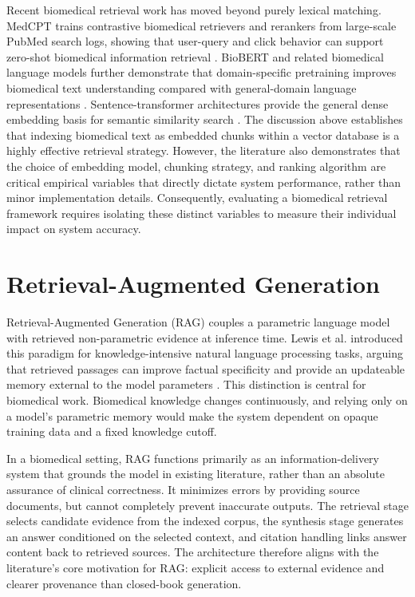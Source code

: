 Recent biomedical retrieval work has moved beyond purely lexical matching. MedCPT trains contrastive biomedical retrievers and rerankers from large-scale PubMed search logs, showing that user-query and click behavior can support zero-shot biomedical information retrieval \cite{jin2023medcpt}. BioBERT and related biomedical language models further demonstrate that domain-specific pretraining improves biomedical text understanding compared with general-domain language representations \cite{lee2020biobert}. Sentence-transformer architectures provide the general dense embedding basis for semantic similarity search \cite{reimers2019sentencebert}. The discussion above establishes that indexing biomedical text as embedded chunks within a vector database is a highly effective retrieval strategy. However, the literature also demonstrates that the choice of embedding model, chunking strategy, and ranking algorithm are critical empirical variables that directly dictate system performance, rather than minor implementation details. Consequently, evaluating a biomedical retrieval framework requires isolating these distinct variables to measure their individual impact on system accuracy.

\section{Retrieval-Augmented Generation}

Retrieval-Augmented Generation (RAG) couples a parametric language model with retrieved non-parametric evidence at inference time. Lewis et al. introduced this paradigm for knowledge-intensive natural language processing tasks, arguing that retrieved passages can improve factual specificity and provide an updateable memory external to the model parameters \cite{lewis2020rag}. This distinction is central for biomedical work. Biomedical knowledge changes continuously, and relying only on a model's parametric memory would make the system dependent on opaque training data and a fixed knowledge cutoff.

In a biomedical setting, RAG functions primarily as an information-delivery system that grounds the model in existing literature, rather than an absolute assurance of clinical correctness. It minimizes errors by providing source documents, but cannot completely prevent inaccurate outputs. The retrieval stage selects candidate evidence from the indexed corpus, the synthesis stage generates an answer conditioned on the selected context, and citation handling links answer content back to retrieved sources. The architecture therefore aligns with the literature's core motivation for RAG: explicit access to external evidence and clearer provenance than closed-book generation.


